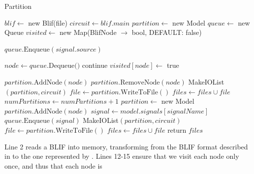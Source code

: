 \documentclass[12pt,final,oneside]{dwThesis} %
\begin{document}
   \begin{algorithm}
      \caption{Partition}\label{partition}

      \begin{algorithmic}
         [1]  
         \State $blif \gets$
         new Blif(file)  
         \State $circuit \gets
         blif.main$  
         \State
         $partition \gets$ new Model  
         \State $queue
         \gets$ new Queue  
         \State $visited \gets$ new
         Map(BlifNode $\to$ bool, DEFAULT: false)

         \State
         $queue.\mbox{Enqueue}(signal.source)$ \EndFor

         \State $node \gets queue.\mbox{Dequeue()}$
         \State continue  \EndIf 
         \State $visited[node] \gets $ true

         \State $partition.\mbox{AddNode}(node)$
         \State
         $partition.\mbox{RemoveNode}(node)$ 
         \State MakeIOList$(partition,
         circuit)$ 
         \State $file \gets partition.\mbox{WriteToFile}()$ 
         \State
         $files \gets files\cup file$ 
         \State $numPartitions \gets
         numPartitions+1$ 
         \State $partition \gets$ new Model  
         \State $partition.\mbox{AddNode}(node)$ \EndIf
         \State $signal \gets
         model.signals[signalName]$ 
         \State $queue.\mbox{Enqueue}(signal)$
         \EndFor \EndWhile {} 
         \State
         MakeIOList$(partition, circuit)$ 
         \State $file \gets
         partition.\mbox{WriteToFile}()$ 
         \State $files \gets files\cup file$
         \EndIf 
         \State return $files$ \EndProcedure 
      \end{algorithmic}


   \end{algorithm}
   \FloatBarrier Line 2 reads a \gls{BLIF} into memory,
   transforming from the \gls{BLIF} format described in  to the one represented by .  Lines
   12-15 ensure that we visit each node only once, and thus that each node is
\end{document}
